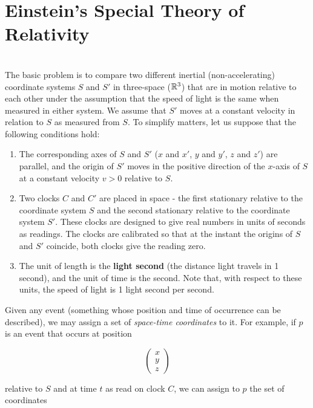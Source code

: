 \section{Einstein's Special Theory of Relativity}

\begin{definition}
	\hfill\\
	The basic problem is to compare two different inertial (non-accelerating) coordinate systems $S$ and $S'$ in three-space ($\mathbb{R}^3$) that are in motion relative to each other under the assumption that the speed of light is the same when measured in either system. We assume that $S'$ moves at a constant velocity in relation to $S$ as measured from $S$. To simplify matters, let us suppose that the following conditions hold:

	\begin{enumerate}
		\item The corresponding axes of $S$ and $S'$ ($x$ and $x'$, $y$ and $y'$, $z$ and $z'$) are parallel, and the origin of $S'$ moves in the positive direction of the $x$-axis of $S$ at a constant velocity $v > 0$ relative to $S$.
		\item Two clocks $C$ and $C'$ are placed in space - the first stationary relative to the coordinate system $S$ and the second stationary relative to the coordinate system $S'$. These clocks are designed to give real numbers in units of seconds as readings. The clocks are calibrated so that at the instant the origins of $S$ and $S'$ coincide, both clocks give the reading zero.
		\item The unit of length is the \textbf{light second} (the distance light travels in 1 second), and the unit of time is the second. Note that, with respect to these units, the speed of light is 1 light second per second.
	\end{enumerate}

	Given any event (something whose position and time of occurrence can be described), we may assign a set of \textit{space-time coordinates} to it. For example, if $p$ is an event that occurs at position

	\[\begin{pmatrix} x \\ y \\ z \end{pmatrix}\]

	relative to $S$ and at time $t$ as read on clock $C$, we can assign to $p$ the set of coordinates


\end{definition}
